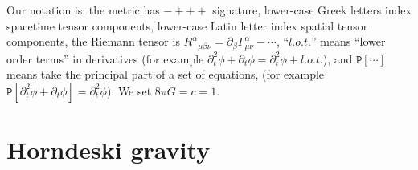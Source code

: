 \documentclass{ws-ijmpd}
\begin{document}
Our notation is: the metric has $-+++$ signature, 
lower-case Greek letters index spacetime tensor components,
lower-case Latin letter index spatial tensor components,
the Riemann tensor is 
$R^{\alpha}{}_{\mu\beta\nu}
=
\partial_{\beta}\Gamma^{\alpha}_{\mu\nu}-\cdots$,
``$l.o.t.$'' means ``lower order terms'' in derivatives 
(for example $\partial_t^2\phi+\partial_t\phi = \partial_t^2\phi+l.o.t.$),
and $\mathtt{P}\left[\cdots\right]$ means take the principal part of 
a set of equations, 
(for example 
$\mathtt{P}\left[\partial_t^2\phi+\partial_t\phi\right] = \partial_t^2\phi$).
We set $8\pi G = c = 1$.

\section{Horndeski gravity
   \label{sec:horndeski_gravity}
}	
\end{document}
